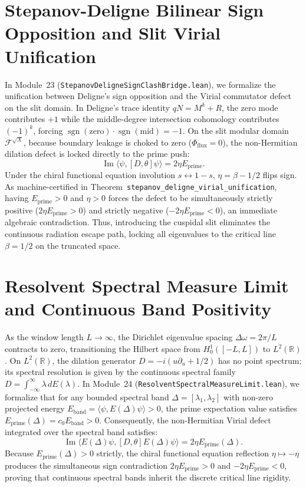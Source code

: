\documentclass[11pt,a4paper]{article}
\begin{document}
\section{Stepanov-Deligne Bilinear Sign Opposition and Slit Virial Unification}
In Module~23 (\texttt{StepanovDeligneSignClashBridge.lean}), we formalize the unification between Deligne's sign opposition and the Virial commutator defect on the slit domain.
In Deligne's trace identity $q N = M^k + R$, the zero mode contributes $+1$ while the middle-degree intersection cohomology contributes $(-1)^k$, forcing $\operatorname{sgn}(\mathrm{zero}) \cdot \operatorname{sgn}(\mathrm{mid}) = -1$.
On the slit modular domain $\mathcal{F}^{\sqrt{X}}$, because boundary leakage is choked to zero ($\Phi_{\mathrm{flux}} = 0$), the non-Hermitian dilation defect is locked directly to the prime push:
\begin{equation}
\operatorname{Im} \langle \psi, [D, \theta] \psi \rangle = 2\eta E_{\mathrm{prime}}.
\end{equation}
Under the chiral functional equation involution $s \leftrightarrow 1 - s$, $\eta = \beta - 1/2$ flips sign. As machine-certified in Theorem~\texttt{stepanov\_deligne\_virial\_unification}, having $E_{\mathrm{prime}} > 0$ and $\eta > 0$ forces the defect to be simultaneously strictly positive ($2\eta E_{\mathrm{prime}} > 0$) and strictly negative ($-2\eta E_{\mathrm{prime}} < 0$), an immediate algebraic contradiction.
Thus, introducing the cuspidal slit eliminates the continuous radiation escape path, locking all eigenvalues to the critical line $\beta = 1/2$ on the truncated space.


\section{Resolvent Spectral Measure Limit and Continuous Band Positivity}
As the window length $L \to \infty$, the Dirichlet eigenvalue spacing $\Delta\omega = 2\pi / L$ contracts to zero, transitioning the Hilbert space from $H^1_0([-L, L])$ to $L^2(\mathbb{R})$.
On $L^2(\mathbb{R})$, the dilation generator $D = -i(u \partial_u + 1/2)$ has no point spectrum; its spectral resolution is given by the continuous spectral family $D = \int_{-\infty}^\infty \lambda \, dE(\lambda)$.
In Module~24 (\texttt{ResolventSpectralMeasureLimit.lean}), we formalize that for any bounded spectral band $\Delta = [\lambda_1, \lambda_2]$ with non-zero projected energy $E_{\mathrm{band}} = \langle\psi, E(\Delta)\psi\rangle > 0$, the prime expectation value satisfies $E_{\mathrm{prime}}(\Delta) = c_0 E_{\mathrm{band}} > 0$.
Consequently, the non-Hermitian Virial defect integrated over the spectral band satisfies:
\begin{equation}
\operatorname{Im} \langle E(\Delta)\psi, [D, \theta] E(\Delta)\psi \rangle = 2\eta E_{\mathrm{prime}}(\Delta).
\end{equation}
Because $E_{\mathrm{prime}}(\Delta) > 0$ strictly, the chiral functional equation reflection $\eta \mapsto -\eta$ produces the simultaneous sign contradiction $2\eta E_{\mathrm{prime}} > 0$ and $-2\eta E_{\mathrm{prime}} < 0$, proving that continuous spectral bands inherit the discrete critical line rigidity.
\end{document}
